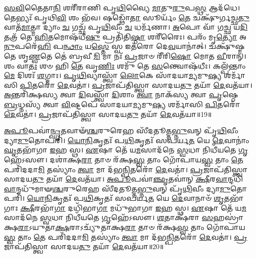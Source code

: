 \-\ul{𑌸}\-\-\ul{𑌵𑌿}\-𑌤𑍈𑌤𑌾\-\ul{𑌨𑌿} 𑌶𑌰𑍀᳴𑌰𑌾𑌣𑌿 𑌪𑍃\-\ul{𑌥𑌿}\-𑌵𑍍𑌯𑍈 \ul{𑌮𑌾}\-𑌤𑍁\-\ul{𑌰𑍁}\-𑌪\-\ul{𑌸𑍍𑌥} 𑌆𑌦᳴𑌧𑍇। 
𑌤𑍇𑌭𑍍𑌯𑌃᳴ 𑌪𑍃𑌥𑌿\-\ul{𑌵𑌿} 𑌶𑌂 𑌭᳴𑌵। 
𑌷𑌡𑍍𑌢𑍋᳴\-\ul{𑌤𑌾} 𑌸𑍂𑌰𑍍𑌯𑌂᳴ \ul{𑌤𑍇} 𑌚𑌕𑍍𑌷𑍁᳴𑌰𑍍𑌗𑌚𑍍𑌛\-\ul{𑌤𑍁} 𑌵𑌾𑌤᳴\-\ul{𑌮𑌾}\-𑌤𑍍𑌮𑌾 𑌦𑍍𑌯𑌾𑌂 \ul{𑌚} 𑌗𑌚𑍍𑌛᳴ 𑌪𑍃\-\ul{𑌥𑌿}\-𑌵𑍀𑌂 \ul{𑌚} 𑌧𑌰𑍍𑌮᳴𑌣𑌾। 
\-\ul{𑌅}\-𑌪𑍋 𑌵𑌾᳴ 𑌗\-\ul{𑌚𑍍𑌛} 𑌯\-\ul{𑌦𑌿} 𑌤𑌤𑍍𑌰᳴ 𑌤𑍇 \ul{𑌹𑌿}\-𑌤𑌮𑍋𑌷᳴𑌧𑍀\-\ul{𑌷𑍁} 𑌪𑍍𑌰𑌤𑌿᳴𑌤𑌿\-\ul{𑌷𑍍𑌠𑌾} 𑌶𑌰𑍀᳴𑌰𑍈𑌃। 
𑌪𑌰𑌂᳴ 𑌮𑍃\-\ul{𑌤𑍍𑌯𑍋} 𑌅\-\ul{𑌨𑍁}\-𑌪𑌰𑍇᳴\-\ul{𑌹𑌿} 𑌪\-\ul{𑌨𑍍𑌥𑌾𑌂} 𑌯\-\ul{𑌸𑍍𑌤𑍇} 𑌸𑍍𑌵 𑌇𑌤᳴𑌰𑍋 𑌦𑍇\-\ul{𑌵}\-𑌯𑌾𑌨𑌾॑𑌤𑍍। 
𑌚𑌕𑍍𑌷𑍁᳴𑌷𑍍𑌮𑌤𑍇 𑌶𑍃\-\ul{𑌣𑍍𑌵}\-𑌤𑍇 𑌤𑍇॑ 𑌬𑍍𑌰𑌵𑍀\-\ul{𑌮𑌿} 𑌮𑌾 𑌨𑌃᳴ \ul{𑌪𑍍𑌰}\-𑌜𑌾𑍞 𑌰𑍀᳴𑌰𑌿\-\ul{𑌷𑍋} 𑌮𑍋𑌤 \ul{𑌵𑍀}\-𑌰𑌾𑌨𑍍। 
𑌶𑌂 𑌵𑌾\-\ul{𑌤𑌃} 𑌶𑍞 𑌹𑌿 \ul{𑌤𑍇} 𑌘𑍃\-\ul{𑌣𑌿𑌃} 𑌶𑌮𑍁᳴ 𑌤𑍇 \ul{𑌸}\-𑌨𑍍𑌤𑍍𑌵𑍋𑌷᳴𑌧𑍀𑌃। 
𑌕𑌲𑍍𑌪᳴𑌨𑍍𑌤𑌾𑌂 \ul{𑌮𑍇} 𑌦𑌿𑌶𑌃᳴ \ul{𑌶}\-𑌗𑍍𑌮𑌾𑌃। 
\-\ul{𑌪𑍃}\-\-\ul{𑌥𑌿}\-𑌵𑍍𑌯𑌾𑌸𑍍𑌤𑍍𑌵𑌾᳴ \ul{𑌲𑍋}\-𑌕𑍇 𑌸𑌾᳴𑌦𑌯𑌾\-\ul{𑌮𑍍𑌯}\-𑌮𑍁\-\ul{𑌷𑍍𑌯} 𑌶𑌰𑍍𑌮𑌾᳴𑌸𑌿 \ul{𑌪𑌿}\-𑌤𑌰𑍋᳴ \ul{𑌦𑍇}\-𑌵𑌤𑌾॑। 
\-\ul{𑌪𑍍𑌰}\-𑌜𑌾𑌪᳴𑌤𑌿𑌸𑍍𑌤𑍍𑌵𑌾 𑌸𑌾𑌦𑌯\-\ul{𑌤𑍁} 𑌤𑌯𑌾᳴ \ul{𑌦𑍇}\-𑌵𑌤᳴𑌯𑌾। 
\-\ul{𑌅}\-𑌨𑍍𑌤𑌰𑌿᳴𑌕𑍍𑌷𑌸𑍍𑌯 𑌤𑍍𑌵𑌾 \ul{𑌦𑌿}\-𑌵𑌸𑍍𑌤𑍍𑌵𑌾᳴ \ul{𑌦𑌿}\-𑌶𑌾𑌂 \ul{𑌤𑍍𑌵𑌾} 𑌨𑌾𑌕᳴𑌸𑍍𑌯 𑌤𑍍𑌵𑌾 \ul{𑌪𑍃}\-𑌷𑍍𑌠𑍇 \ul{𑌬𑍍𑌰}\-𑌧𑍍𑌨𑌸𑍍𑌯᳴ 𑌤𑍍𑌵𑌾 \ul{𑌵𑌿}\-𑌷𑍍𑌟𑌪𑍇᳴ 𑌸𑌾𑌦𑌯𑌾\-\ul{𑌮𑍍𑌯}\-𑌮𑍁\-\ul{𑌷𑍍𑌯} 𑌶𑌰𑍍𑌮𑌾᳴𑌸𑌿 \ul{𑌪𑌿}\-𑌤𑌰𑍋᳴ \ul{𑌦𑍇}\-𑌵𑌤𑌾॑। 
\-\ul{𑌪𑍍𑌰}\-𑌜𑌾𑌪᳴𑌤𑌿𑌸𑍍𑌤𑍍𑌵𑌾 𑌸𑌾𑌦𑌯\-\ul{𑌤𑍁} 𑌤𑌯𑌾᳴ \ul{𑌦𑍇}\-𑌵𑌤᳴𑌯𑌾॥19॥

\-\ul{𑌅}\-\-\ul{𑌪𑍂}\-𑌪𑌵𑌾॑\-\ul{𑌨𑍍𑌘𑍃}\-𑌤𑌵𑌾𑍟᳴\-\ul{𑌶𑍍𑌚}\-𑌰𑍁𑌰𑍇𑌹 𑌸𑍀᳴𑌦𑌤𑍂𑌤𑍍𑌤\-\ul{𑌭𑍍𑌨𑍁}\-𑌵𑌨𑍍 𑌪𑍃᳴\-\ul{𑌥𑌿}\-𑌵𑍀𑌂 𑌦𑍍𑌯𑌾\-\ul{𑌮𑍁}\-𑌤𑍋𑌪𑌰𑌿᳴। 
\-\ul{𑌯𑍋}\-\-\ul{𑌨𑌿}\-𑌕𑍃𑌤𑌃᳴ 𑌪\-\ul{𑌥𑌿}\-𑌕𑍃𑌤𑌃᳴ 𑌸𑌪𑌰𑍍𑌯\-\ul{𑌤} 𑌯𑍇 \ul{𑌦𑍇}\-𑌵𑌾𑌨𑌾𑌂॑ \ul{𑌘𑍃}\-𑌤𑌭𑌾᳴𑌗𑌾 \ul{𑌇}\-𑌹 𑌸𑍍𑌥। 
\-\ul{𑌏}\-𑌷𑌾 𑌤𑍇᳴ 𑌯\-\ul{𑌮}\-𑌸𑌾𑌦᳴𑌨𑍇 \ul{𑌸𑍍𑌵}\-𑌧𑌾 𑌨𑌿𑌧𑍀᳴𑌯𑌤𑍇 \ul{𑌗𑍃}\-𑌹𑍇᳴𑌽𑌸𑍗। 
𑌦𑌶𑌾॑𑌕𑍍𑌷\-\ul{𑌰𑌾} 𑌤𑌾𑍞 𑌰᳴𑌕𑍍𑌷\-\ul{𑌸𑍍𑌵} 𑌤𑌾𑌂 𑌗𑍋᳴𑌪𑌾𑌯\-\ul{𑌸𑍍𑌵} 𑌤𑌾𑌂 \ul{𑌤𑍇} 𑌪𑌰𑌿᳴𑌦𑌦𑌾\-\ul{𑌮𑌿} 𑌤𑌸𑍍𑌯𑌾𑌂॑ \ul{𑌤𑍍𑌵𑌾} 𑌮𑌾 𑌦᳴𑌭\-\ul{𑌨𑍍𑌪𑌿}\-𑌤𑌰𑍋᳴ \ul{𑌦𑍇}\-𑌵𑌤𑌾॑। 
\-\ul{𑌪𑍍𑌰}\-𑌜𑌾𑌪᳴𑌤𑌿𑌸𑍍𑌤𑍍𑌵𑌾 𑌸𑌾𑌦𑌯\-\ul{𑌤𑍁} 𑌤𑌯𑌾᳴ \ul{𑌦𑍇}\-𑌵𑌤᳴𑌯𑌾। 
\-\ul{𑌅}\-\-\ul{𑌪𑍂}\-𑌪𑌵𑌾॑\-\ul{𑌞𑍍𑌛𑍃}\-𑌤𑌵𑌾॑𑌨𑍍 \ul{𑌕𑍍𑌷𑍀}\-𑌰\-\ul{𑌵𑌾}\-𑌨𑍍𑌦𑌧𑌿᳴\-\ul{𑌵𑌾}\-𑌨𑍍𑌮𑌧𑍁᳴𑌮𑌾𑍟\-\ul{𑌶𑍍𑌚}\-𑌰𑍁𑌰𑍇𑌹 𑌸𑍀᳴𑌦𑌤𑍂𑌤𑍍𑌤\-\ul{𑌭𑍍𑌨𑍁}\-𑌵𑌨𑍍 𑌪𑍃᳴\-\ul{𑌥𑌿}\-𑌵𑍀𑌂 𑌦𑍍𑌯𑌾\-\ul{𑌮𑍁}\-𑌤𑍋𑌪𑌰𑌿᳴। 
\-\ul{𑌯𑍋}\-\-\ul{𑌨𑌿}\-𑌕𑍃𑌤𑌃᳴ 𑌪\-\ul{𑌥𑌿}\-𑌕𑍃𑌤𑌃᳴ 𑌸𑌪𑌰𑍍𑌯\-\ul{𑌤} 𑌯𑍇 \ul{𑌦𑍇}\-𑌵𑌾𑌨𑌾𑍞᳴ \ul{𑌶𑍃}\-𑌤𑌭𑌾᳴𑌗𑌾𑌃 \ul{𑌕𑍍𑌷𑍀}\-𑌰𑌭𑌾᳴\-\ul{𑌗𑌾} 𑌦𑌧𑌿᳴𑌭𑌾\-\ul{𑌗𑌾} 𑌮𑌧𑍁᳴𑌭𑌾𑌗𑌾 \ul{𑌇}\-𑌹 𑌸𑍍𑌥। 
\-\ul{𑌏}\-𑌷𑌾 𑌤𑍇᳴ 𑌯\-\ul{𑌮}\-𑌸𑌾𑌦᳴𑌨𑍇 \ul{𑌸𑍍𑌵}\-𑌧𑌾 𑌨𑌿𑌧𑍀᳴𑌯𑌤𑍇 \ul{𑌗𑍃}\-𑌹𑍇᳴𑌽𑌸𑍗। 
\-\ul{𑌶}\-𑌤𑌾𑌕𑍍𑌷᳴𑌰𑌾 \ul{𑌸}\-𑌹𑌸𑍍𑌰𑌾॑𑌕𑍍𑌷\-\ul{𑌰𑌾}\-𑌽𑌯𑍁𑌤𑌾॑\-\ul{𑌕𑍍𑌷}\-𑌰𑌾𑌽𑌚𑍍𑌯𑍁᳴𑌤𑌾𑌕𑍍𑌷\-\ul{𑌰𑌾} 𑌤𑌾𑍞 𑌰᳴𑌕𑍍𑌷\-\ul{𑌸𑍍𑌵} 𑌤𑌾𑌂 𑌗𑍋᳴𑌪𑌾𑌯\-\ul{𑌸𑍍𑌵} 𑌤𑌾𑌂 \ul{𑌤𑍇} 𑌪𑌰𑌿᳴𑌦𑌦𑌾\-\ul{𑌮𑌿} 𑌤𑌸𑍍𑌯𑌾𑌂॑ \ul{𑌤𑍍𑌵𑌾} 𑌮𑌾 𑌦᳴𑌭\-\ul{𑌨𑍍𑌪𑌿}\-𑌤𑌰𑍋᳴ \ul{𑌦𑍇}\-𑌵𑌤𑌾॑। 
\-\ul{𑌪𑍍𑌰}\-𑌜𑌾𑌪᳴𑌤𑌿𑌸𑍍𑌤𑍍𑌵𑌾 𑌸𑌾𑌦𑌯\-\ul{𑌤𑍁} 𑌤𑌯𑌾᳴ \ul{𑌦𑍇}\-𑌵𑌤᳴𑌯𑌾॥20॥
\anuvakamend[𑌅𑌨᳴𑌪𑌸𑍍𑌫𑍁𑌰\-\ul{𑌨𑍍𑌤𑍀}\-𑌰𑍁𑌤𑍍𑌤᳴𑌰 \ul{𑌦𑍇}\-𑌵𑌤᳴\-\ul{𑌯𑌾} 𑌦𑍍𑌵𑍇 𑌚᳴]

